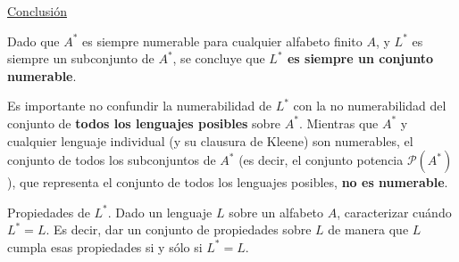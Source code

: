 \documentclass[12pt]{report} %
\begin{document}
\begin{solucion}
\underline{Conclusión}

Dado que \(A^*\) es siempre numerable para cualquier alfabeto finito \(A\), y \(L^*\) es siempre un subconjunto de \(A^*\), se concluye que \textbf{\(L^*\) es siempre un conjunto numerable}.

Es importante no confundir la numerabilidad de \(L^*\) con la no numerabilidad del conjunto de \textbf{todos los lenguajes posibles} sobre \(A^*\). Mientras que \(A^*\) y cualquier lenguaje individual (y su clausura de Kleene) son numerables, el conjunto de todos los subconjuntos de \(A^*\) (es decir, el conjunto potencia \(\mathcal{P}(A^*)\)), que representa el conjunto de todos los lenguajes posibles, \textbf{no es numerable}.

\end{solucion}

\begin{ejercicio}
Propiedades de $L^*$. Dado un lenguaje $L$ sobre un alfabeto $A$, caracterizar cuándo $L^* = L$. Es decir, dar un conjunto de propiedades sobre $L$ de manera que $L$ cumpla esas propiedades si y sólo si $L^* = L$.
\end{ejercicio}
\end{document}
